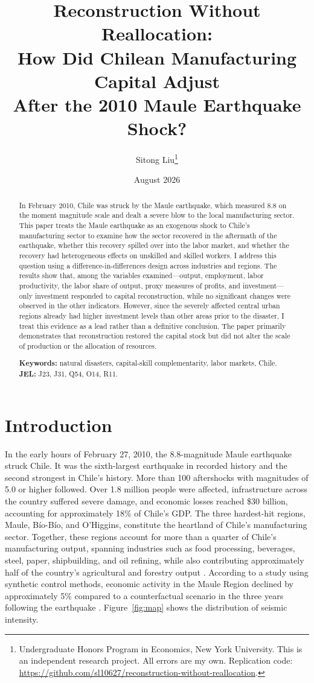 \documentclass[12pt]{article}
\title{\Large\bfseries Reconstruction Without Reallocation:\\
How Did Chilean Manufacturing Capital Adjust\\
After the 2010 Maule Earthquake Shock?}
\author{Sitong Liu\thanks{Undergraduate Honors Program in Economics, New York University.
This is an independent research project. All errors are my own. Replication code:
\url{https://github.com/sl10627/reconstruction-without-reallocation}.}}
\date{August 2026}
\begin{document}
\maketitle

\begin{abstract}
\noindent In February 2010, Chile was struck by the Maule earthquake, which measured 8.8 on the
moment magnitude scale and dealt a severe blow to the local manufacturing sector. This paper
treats the Maule earthquake as an exogenous shock to Chile's manufacturing sector to examine how
the sector recovered in the aftermath of the earthquake, whether this recovery spilled over into
the labor market, and whether the recovery had heterogeneous effects on unskilled and skilled
workers. I address this question using a difference-in-differences design across industries and
regions. The results show that, among the variables examined---output, employment, labor
productivity, the labor share of output, proxy measures of profits, and investment---only
investment responded to capital reconstruction, while no significant changes were observed in the
other indicators. However, since the severely affected central urban regions already had higher
investment levels than other areas prior to the disaster, I treat this evidence as a lead rather
than a definitive conclusion. The paper primarily demonstrates that reconstruction restored the capital
stock but did not alter the scale of production or the allocation of resources.

\medskip
\noindent \textbf{Keywords:} natural disasters, capital-skill complementarity, labor markets,
Chile. \quad \textbf{JEL:} J23, J31, Q54, O14, R11.
\end{abstract}

\thispagestyle{empty}
\clearpage
\setcounter{page}{1}

\section{Introduction}\label{sec:intro}

In the early hours of February 27, 2010, the 8.8-magnitude Maule earthquake struck Chile. It was
the sixth-largest earthquake in recorded history and the second strongest in Chile's history. More than 100 aftershocks with magnitudes of 5.0 or higher followed. Over
1.8 million people were affected, infrastructure across the country suffered severe damage, and
economic losses reached \$30 billion, accounting for approximately 18\% of Chile's GDP. The three hardest-hit regions, Maule, B\'io-B\'io, and O'Higgins, constitute
the heartland of Chile's manufacturing sector. Together, these regions account for more than a
quarter of Chile's manufacturing output, spanning industries such as food processing, beverages,
steel, paper, shipbuilding, and oil refining, while also contributing approximately half of the
country's agricultural and forestry output \citep{barcena2010}. According to a study using
synthetic control methods, economic activity in the Maule Region declined by approximately 5\%
compared to a counterfactual scenario in the three years following the earthquake
\citep{diaz2024}. Figure~\ref{fig:map} shows the distribution of seismic intensity.
\end{document}
